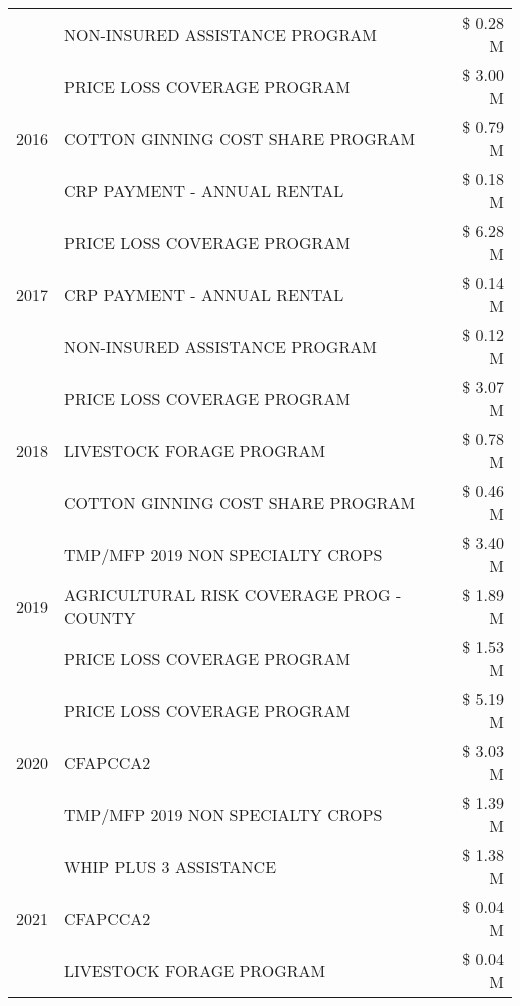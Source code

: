 \begin{tabular}{llr}
 & NON-INSURED ASSISTANCE PROGRAM & \$ 0.28 M \\
\cline{1-3}
\multirow[t]{3}{*}{2016} & PRICE LOSS COVERAGE PROGRAM & \$ 3.00 M \\
 & COTTON GINNING COST SHARE PROGRAM & \$ 0.79 M \\
 & CRP PAYMENT - ANNUAL RENTAL & \$ 0.18 M \\
\cline{1-3}
\multirow[t]{3}{*}{2017} & PRICE LOSS COVERAGE PROGRAM & \$ 6.28 M \\
 & CRP PAYMENT - ANNUAL RENTAL & \$ 0.14 M \\
 & NON-INSURED ASSISTANCE PROGRAM & \$ 0.12 M \\
\cline{1-3}
\multirow[t]{3}{*}{2018} & PRICE LOSS COVERAGE PROGRAM & \$ 3.07 M \\
 & LIVESTOCK FORAGE PROGRAM & \$ 0.78 M \\
 & COTTON GINNING COST SHARE PROGRAM & \$ 0.46 M \\
\cline{1-3}
\multirow[t]{3}{*}{2019} & TMP/MFP 2019 NON SPECIALTY CROPS & \$ 3.40 M \\
 & AGRICULTURAL RISK COVERAGE PROG - COUNTY & \$ 1.89 M \\
 & PRICE LOSS COVERAGE PROGRAM & \$ 1.53 M \\
\cline{1-3}
\multirow[t]{3}{*}{2020} & PRICE LOSS COVERAGE PROGRAM & \$ 5.19 M \\
 & CFAPCCA2 & \$ 3.03 M \\
 & TMP/MFP 2019 NON SPECIALTY CROPS & \$ 1.39 M \\
\cline{1-3}
\multirow[t]{3}{*}{2021} & WHIP PLUS 3 ASSISTANCE & \$ 1.38 M \\
 & CFAPCCA2 & \$ 0.04 M \\
 & LIVESTOCK FORAGE PROGRAM & \$ 0.04 M \\
\cline{1-3}
\bottomrule
\end{tabular}
